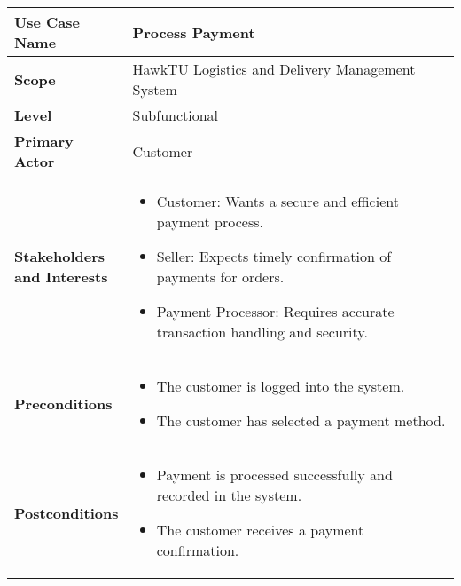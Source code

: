 \documentclass{article}
\begin{document}
\begin{longtable}{|>{\raggedright\arraybackslash}m{0.25\linewidth}|m{0.75\linewidth}|}
\hline
\textbf{Use Case Name} & Process Payment \\
\hline
\textbf{Scope} & HawkTU Logistics and Delivery Management System \\
\hline
\textbf{Level} & Subfunctional \\
\hline
\textbf{Primary Actor} & Customer \\
\hline
\textbf{Stakeholders and Interests} & 
\begin{itemize}
    \item Customer: Wants a secure and efficient payment process.
    \item Seller: Expects timely confirmation of payments for orders.
    \item Payment Processor: Requires accurate transaction handling and security.
\end{itemize} \\
\hline
\textbf{Preconditions} & 
\begin{itemize}
    \item The customer is logged into the system.
    \item The customer has selected a payment method.
\end{itemize} \\
\hline
\textbf{Postconditions} & 
\begin{itemize}
    \item Payment is processed successfully and recorded in the system.
    \item The customer receives a payment confirmation.
\end{itemize} \\
\hline
\end{longtable}

\vspace{-2.45em}
\end{document}
